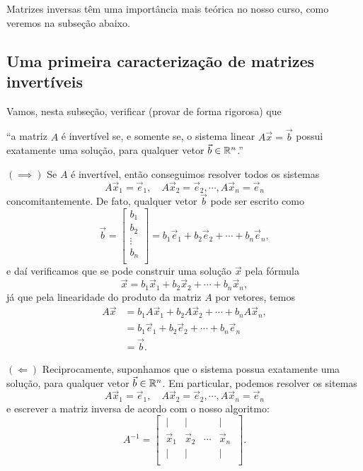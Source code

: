 \documentclass[../livro.tex]{subfiles}  %
\begin{document}
Matrizes inversas têm uma importância mais teórica no nosso curso, como veremos na subseção abaixo.



\subsection{Uma primeira caracterização de matrizes invertíveis}\label{sec:inversa}


Vamos, nesta subseção, verificar (provar de forma rigorosa) que
\begin{center}
  ``a matriz $A$ é invertível se, e somente se, o sistema linear $A \vec{x} = \vec{b}$ possui exatamente uma solução, para qualquer vetor $\vec{b} \in \mathbb{R}^n$.''
\end{center}

\noindent $(\!\implies\!\!)$ Se $A$ é invertível, então conseguimos resolver todos os sistemas
\[
A \vec{x}_1 = \vec{e}_1, \quad A \vec{x}_2 = \vec{e}_2, \cdots, A \vec{x}_n = \vec{e}_n
\] concomitantemente. De fato, qualquer vetor $\vec{b}$ pode ser escrito como
\[
\vec{b} =  
\left[
\begin{array}{c}
b_1 \\
b_2 \\
\vdots \\
b_n \\
\end{array}
\right] = 
b_1 \vec{e}_1 + b_2 \vec{e}_2 + \cdots + b_n \vec{e}_n,
\] e daí verificamos que se pode construir uma solução $\vec{x}$ pela fórmula
\[
\vec{x} = b_1 \vec{x}_1 + b_2 \vec{x}_2 + \cdots + b_n \vec{x}_n,
\] já que pela linearidade do produto da matriz $A$ por vetores, temos
\begin{align*}
A  \vec{x} & = b_1 A\vec{x}_1 + b_2 A\vec{x}_2 + \cdots + b_n A\vec{x}_n, \\
& = b_1 \vec{e}_1 + b_2 \vec{e}_2 + \cdots + b_n \vec{e}_n \\
& = \vec{b}.
\end{align*}

\noindent $(\!\Longleftarrow)$ Reciprocamente, suponhamos que o sistema possua exatamente uma solução, para qualquer vetor $\vec{b} \in \mathbb{R}^n$. Em particular, podemos resolver os sitemas
\[
A \vec{x}_1 = \vec{e}_1, \quad A \vec{x}_2 = \vec{e}_2, \cdots, A \vec{x}_n = \vec{e}_n
\] e escrever a matriz inversa de acordo com o nosso algoritmo:
\[
A^{-1} = 
\begin{bmatrix}
\ |  &  |  &   & | \ \\
\ \vec{x}_1  &  \vec{x}_2 & \cdots & \vec{x}_n \ \\
\ |  &  |  &   & | \ \\
\end{bmatrix}.
\]
\end{document}
